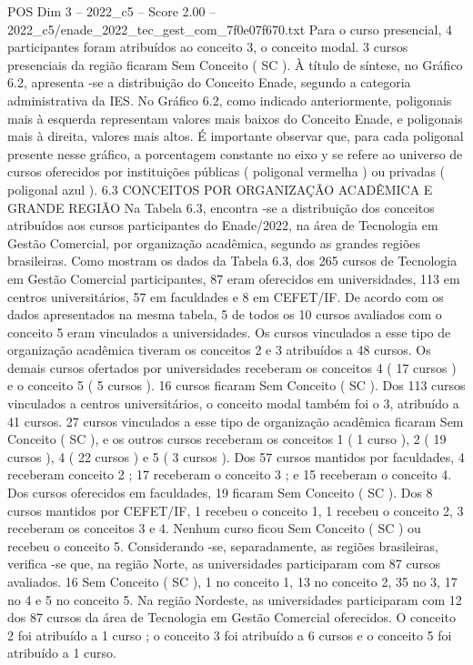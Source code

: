 \begin{textsample}{POS Dim 3 – 2022\_c5 – Score 2.00 – 2022\_c5/enade\_2022\_tec\_gest\_com\_7f0e07f670.txt}
Para o curso presencial, 4 participantes foram atribuídos ao conceito 3, o conceito modal. 3 cursos presenciais da região ficaram Sem Conceito ( SC ).
À título de síntese, no Gráfico 6.2, apresenta -se a distribuição do Conceito Enade, segundo a categoria administrativa da IES.
No Gráfico 6.2, como indicado anteriormente, poligonais mais à esquerda representam valores mais baixos do Conceito Enade, e poligonais mais à direita, valores mais altos.
É importante observar que, para cada poligonal presente nesse gráfico, a porcentagem constante no eixo y se refere ao universo de cursos oferecidos por instituições públicas ( poligonal vermelha ) ou privadas ( poligonal azul ). 6.3 CONCEITOS POR ORGANIZAÇÃO ACADÊMICA E GRANDE REGIÃO Na Tabela 6.3, encontra -se a distribuição dos conceitos atribuídos aos cursos participantes do Enade/2022, na área de Tecnologia em Gestão Comercial, por organização acadêmica, segundo as grandes regiões brasileiras.
Como mostram os dados da Tabela 6.3, dos 265 cursos de Tecnologia em Gestão Comercial participantes, 87 eram oferecidos em universidades, 113 em centros universitários, 57 em faculdades e 8 em CEFET/IF.
De acordo com os dados apresentados na mesma tabela, 5 de todos os 10 cursos avaliados com o conceito 5 eram vinculados a universidades.
Os cursos vinculados a esse tipo de organização acadêmica tiveram os conceitos 2 e 3 atribuídos a 48 cursos.
Os demais cursos ofertados por universidades receberam os conceitos 4 ( 17 cursos ) e o conceito 5 ( 5 cursos ). 16 cursos ficaram Sem Conceito ( SC ).
Dos 113 cursos vinculados a centros universitários, o conceito modal também foi o 3, atribuído a 41 cursos. 27 cursos vinculados a esse tipo de organização acadêmica ficaram Sem Conceito ( SC ), e os outros cursos receberam os conceitos 1 ( 1 curso ), 2 ( 19 cursos ), 4 ( 22 cursos ) e 5 ( 3 cursos ).
Dos 57 cursos mantidos por faculdades, 4 receberam conceito 2 ; 17 receberam o conceito 3 ; e 15 receberam o conceito 4.
Dos cursos oferecidos em faculdades, 19 ficaram Sem Conceito ( SC ).
Dos 8 cursos mantidos por CEFET/IF, 1 recebeu o conceito 1, 1 recebeu o conceito 2, 3 receberam os conceitos 3 e 4.
Nenhum curso ficou Sem Conceito ( SC ) ou recebeu o conceito 5.
Considerando -se, separadamente, as regiões brasileiras, verifica -se que, na região Norte, as universidades participaram com 87 cursos avaliados. 16 Sem Conceito ( SC ), 1 no conceito 1, 13 no conceito 2, 35 no 3, 17 no 4 e 5 no conceito 5.
Na região Nordeste, as universidades participaram com 12 dos 87 cursos da área de Tecnologia em Gestão Comercial oferecidos.
O conceito 2 foi atribuído a 1 curso ; o conceito 3 foi atribuído a 6 cursos e o conceito 5 foi atribuído a 1 curso.

\end{textsample}
